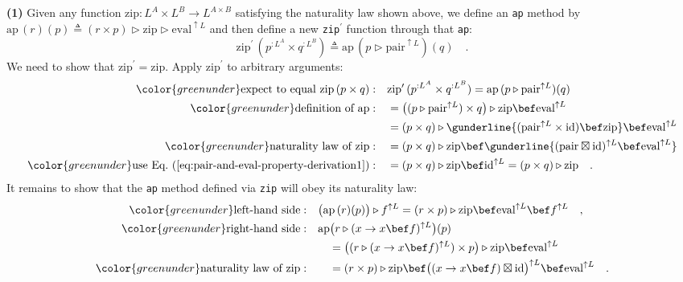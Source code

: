 \textbf{(1)} Given any function $\text{zip}:L^{A}\times L^{B}\rightarrow L^{A\times B}$
satisfying the naturality law shown above, we define an \lstinline!ap!
method by $\text{ap}\,(r)(p)\triangleq(r\times p)\triangleright\text{zip}\triangleright\text{eval}^{\uparrow L}$
and then define a new \lstinline!zip!$^{\prime}$ function through
that \lstinline!ap!:
\[
\text{zip}^{\prime}\,(p^{:L^{A}}\times q^{:L^{B}})\triangleq\text{ap}\,(p\triangleright\text{pair}^{\uparrow L})(q)\quad.
\]
We need to show that $\text{zip}^{\prime}=\text{zip}$. Apply $\text{zip}^{\prime}$
to arbitrary arguments:
\begin{align*}
{\color{greenunder}\text{expect to equal }\text{zip}\,(p\times q):}\quad & \text{zip}^{\prime}\,(p^{:L^{A}}\times q^{:L^{B}})=\text{ap}\,(p\triangleright\text{pair}^{\uparrow L})(q)\\
{\color{greenunder}\text{definition of }\text{ap}:}\quad & =\big((p\triangleright\text{pair}^{\uparrow L})\times q\big)\triangleright\text{zip}\bef\text{eval}^{\uparrow L}\\
 & =(p\times q)\triangleright\gunderline{(\text{pair}^{\uparrow L}\times\text{id})\bef\text{zip}}\bef\text{eval}^{\uparrow L}\\
{\color{greenunder}\text{naturality law of }\text{zip}:}\quad & =(p\times q)\triangleright\text{zip}\bef\gunderline{(\text{pair}\boxtimes\text{id})^{\uparrow L}\bef\text{eval}^{\uparrow L}}\\
{\color{greenunder}\text{use Eq.~(\ref{eq:pair-and-eval-property-derivation1})}:}\quad & =(p\times q)\triangleright\text{zip}\bef\text{id}^{\uparrow L}=(p\times q)\triangleright\text{zip}\quad.
\end{align*}
It remains to show that the \lstinline!ap! method defined via \lstinline!zip!
will obey its naturality law:
\begin{align*}
{\color{greenunder}\text{left-hand side}:}\quad & \big(\text{ap}\,(r)(p)\big)\triangleright f^{\uparrow L}=(r\times p)\triangleright\text{zip}\bef\text{eval}^{\uparrow L}\bef f^{\uparrow L}\quad,\\
{\color{greenunder}\text{right-hand side}:}\quad & \text{ap}\big(r\triangleright(x\rightarrow x\bef f)^{\uparrow L}\big)(p)\\
 & \quad=\big((r\triangleright(x\rightarrow x\bef f)^{\uparrow L})\times p\big)\triangleright\text{zip}\bef\text{eval}^{\uparrow L}\\
{\color{greenunder}\text{naturality law of }\text{zip}:}\quad & \quad=(r\times p)\triangleright\text{zip}\bef\big((x\rightarrow x\bef f)\boxtimes\text{id}\big)^{\uparrow L}\bef\text{eval}^{\uparrow L}\quad.
\end{align*}
